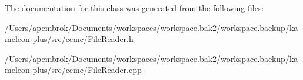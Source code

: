 The documentation for this class was generated from the following files\-:\begin{DoxyCompactItemize}
\item 
/\-Users/apembrok/\-Documents/workspaces/workspace.\-bak2/workspace.\-backup/kameleon-\/plus/src/ccmc/\hyperlink{_file_reader_8h}{File\-Reader.\-h}\item 
/\-Users/apembrok/\-Documents/workspaces/workspace.\-bak2/workspace.\-backup/kameleon-\/plus/src/ccmc/\hyperlink{_file_reader_8cpp}{File\-Reader.\-cpp}\end{DoxyCompactItemize}
